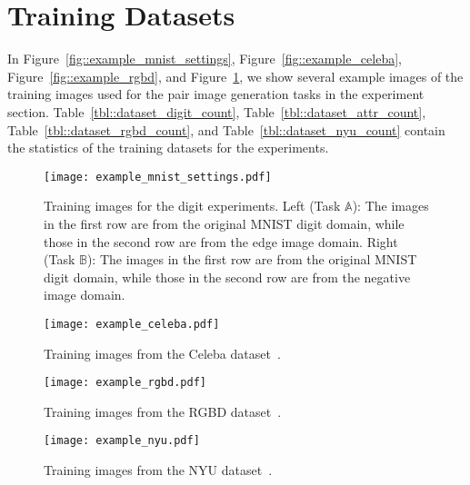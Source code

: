 \documentclass{article}
\begin{document}
\clearpage 
\section{Training Datasets}\label{subsec::datasets}

In Figure~\ref{fig::example_mnist_settings}, Figure~\ref{fig::example_celeba}, Figure~\ref{fig::example_rgbd}, and Figure~\ref{fig::example_nyu}, we show several example images of the training images used for the pair image generation tasks in the experiment section. Table~\ref{tbl::dataset_digit_count}, Table~\ref{tbl::dataset_attr_count}, Table~\ref{tbl::dataset_rgbd_count}, and Table~\ref{tbl::dataset_nyu_count} contain the statistics of the training datasets for the experiments.

\begin{figure}[tbh!]
\centering
\texttt{[image: example\_mnist\_settings.pdf]}
\caption{Training images for the digit experiments. Left (Task $\mathbb{A}$): The images in the first row are from the original MNIST digit domain, while those in the second row are from the edge image domain. Right (Task $\mathbb{B}$): The images in the first row are from the original MNIST digit domain, while those in the second row are from the negative image domain.}
\label{fig::example_mnist_settings}
\vspace{1mm}
\texttt{[image: example\_celeba.pdf]}
\caption{Training images from the Celeba dataset~\cite{liu2015deep}.}
\label{fig::example_celeba}
\vspace{1mm}
\texttt{[image: example\_rgbd.pdf]}
\caption{Training images from the RGBD dataset~\cite{lai2011large}.}
\label{fig::example_rgbd}
\vspace{1mm}
\texttt{[image: example\_nyu.pdf]}
\caption{Training images from the NYU dataset~\cite{silberman2012indoor}.}
\label{fig::example_nyu}
\end{figure}
\end{document}
